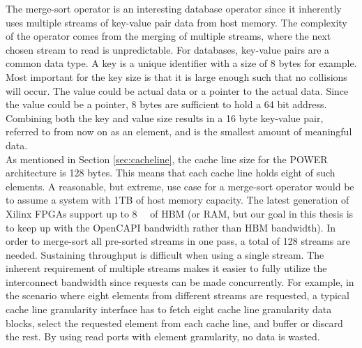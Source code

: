 The merge-sort operator is an interesting database operator since it inherently uses multiple streams of key-value pair data from host memory. The complexity of the operator comes from the merging of multiple streams, where the next chosen stream to read is unpredictable. For databases, key-value pairs are a common data type. A key is a unique identifier with a size of 8 bytes for example. Most important for the key size is that it is large enough such that no collisions will occur. The value could be actual data or a pointer to the actual data. Since the value could be a pointer, 8 bytes are sufficient to hold a 64 bit address. Combining both the key and value size results in a 16 byte key-value pair, referred to from now on as an element, and is the smallest amount of meaningful data.\\
As mentioned in Section \ref{sec:cacheline}, the cache line size for the POWER architecture is 128 bytes. This means that each cache line holds eight of such elements. A reasonable, but extreme, use case for a merge-sort operator would be to assume a system with 1TB of host memory capacity. The latest generation of Xilinx FPGAs support up to \SI{8}{\giga\byte} of HBM (or RAM, but our goal in this thesis is to keep up with the OpenCAPI bandwidth rather than HBM bandwidth). In order to merge-sort all pre-sorted streams in one pass, a total of 128 streams are needed. Sustaining throughput is difficult when using a single stream. The inherent requirement of multiple streams makes it easier to fully utilize the interconnect bandwidth since requests can be made concurrently. For example, in the scenario where eight elements from different streams are requested, a typical cache line granularity interface has to fetch eight cache line granularity data blocks, select the requested element from each cache line, and buffer or discard the rest. By using read ports with element granularity, no data is wasted.



